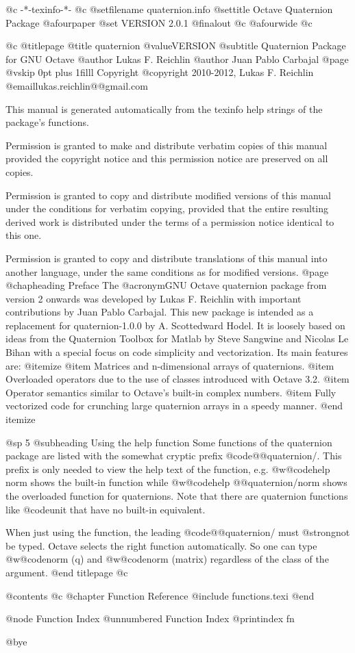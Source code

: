    @c -*-texinfo-*-
@c %
@setfilename quaternion.info
@settitle Octave Quaternion Package
@afourpaper
@set VERSION 2.0.1
@finalout
@c @afourwide
@c %

@c %
@titlepage
@title quaternion @value{VERSION}
@subtitle Quaternion Package for GNU Octave
@author Lukas F. Reichlin
@author Juan Pablo Carbajal
@page
@vskip 0pt plus 1filll
Copyright @copyright{} 2010-2012, Lukas F. Reichlin @email{lukas.reichlin@@gmail.com}

This manual is generated automatically from the texinfo help strings
of the package's functions.

Permission is granted to make and distribute verbatim copies of
this manual provided the copyright notice and this permission notice
are preserved on all copies.

Permission is granted to copy and distribute modified versions of this
manual under the conditions for verbatim copying, provided that the entire
resulting derived work is distributed under the terms of a permission
notice identical to this one.

Permission is granted to copy and distribute translations of this manual
into another language, under the same conditions as for modified versions.
@page
@chapheading Preface
The @acronym{GNU} Octave quaternion package from version 2 onwards
was developed by Lukas F. Reichlin with important contributions by
Juan Pablo Carbajal.  This new package is intended as a replacement
for quaternion-1.0.0 by A. Scottedward Hodel.  It is loosely based
on ideas from the Quaternion Toolbox for Matlab by Steve Sangwine
and Nicolas Le Bihan with a special focus on code simplicity and
vectorization.  Its main features are:
@itemize
@item Matrices and n-dimensional arrays of quaternions.
@item Overloaded operators due to the use of classes introduced with Octave 3.2.
@item Operator semantics similar to Octave's built-in complex numbers.
@item Fully vectorized code for crunching large quaternion arrays in a speedy manner.
@end itemize


@sp 5
@subheading Using the help function
Some functions of the quaternion package are listed with the somewhat cryptic prefix
@code{@@quaternion/}.  This prefix is only needed to view the help text of the function,
e.g. @w{@code{help norm}} shows the built-in function while @w{@code{help @@quaternion/norm}}
shows the overloaded function for quaternions.  Note that there are quaternion functions
like @code{unit} that have no built-in equivalent.

When just using the function, the leading @code{@@quaternion/} must @strong{not} be typed.
Octave selects the right function automatically.  So one can type @w{@code{norm (q)}}
and @w{@code{norm (matrix)}} regardless of the class of the argument.
@end titlepage
@c %

@contents
@c @chapter Function Reference
@include functions.texi
@end

@node Function Index
@unnumbered Function Index
@printindex fn

@bye
